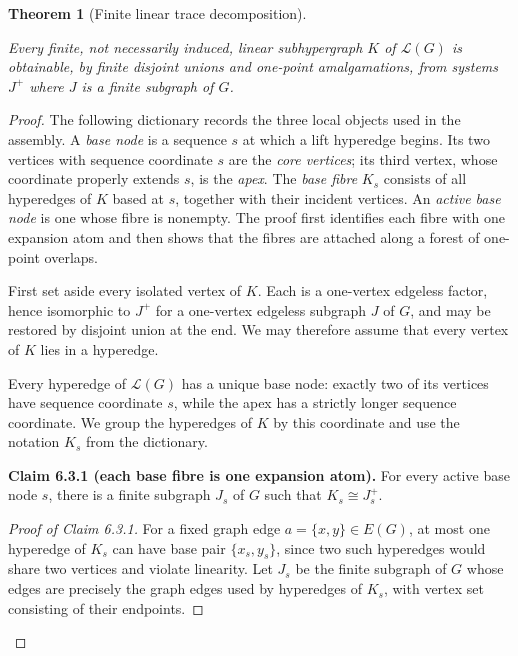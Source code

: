 \documentclass[a4paper,11pt,reqno]{amsart}
\theoremstyle{plain}
\newtheorem{theorem}{Theorem}[section]
\theoremstyle{definition}
\theoremstyle{remark}
\begin{document}
\begin{theorem}[Finite linear trace decomposition]\label{theorem-6.3-exact-finite-linear-trace-theorem}

Every finite, not necessarily induced, linear subhypergraph \(K\) of
\(\mathcal L(G)\) is obtainable, by finite disjoint unions and one-point
amalgamations, from systems \(J^+\) where \(J\) is a finite subgraph of
\(G\).

\end{theorem}
\begin{proof}
The following dictionary records the three local objects used
in the assembly. A \emph{base node} is a sequence \(s\) at which a lift
hyperedge begins. Its two vertices with sequence coordinate \(s\) are the
\emph{core vertices}; its third vertex, whose coordinate properly extends
\(s\), is the \emph{apex}. The \emph{base fibre} \(K_s\) consists of all
hyperedges of \(K\) based at \(s\), together with their incident vertices.
An \emph{active base node} is one whose fibre is nonempty. The proof first
identifies each fibre with one expansion atom and then shows that the fibres
are attached along a forest of one-point overlaps.

First set aside every isolated vertex of \(K\). Each is a one-vertex edgeless
factor, hence isomorphic to \(J^+\) for a one-vertex edgeless subgraph \(J\)
of \(G\), and may be restored by disjoint union at the end. We may therefore
assume that every vertex of \(K\) lies in a hyperedge.

Every hyperedge of \(\mathcal L(G)\) has a unique base node: exactly two of
its vertices have sequence coordinate \(s\), while the apex has a strictly
longer sequence coordinate. We group the hyperedges of \(K\) by this
coordinate and use the notation \(K_s\) from the dictionary.

\medskip
\noindent\textbf{Claim 6.3.1 (each base fibre is one expansion atom).}
For every active base node \(s\), there is a finite subgraph \(J_s\) of
\(G\) such that \(K_s\cong J_s^+\).

\smallskip
\begin{proof}[Proof of Claim 6.3.1]

For a fixed graph edge \(a=\{x,y\}\in E(G)\), at most one hyperedge of \(K_s\) can have base pair \(\{x_s,y_s\}\), since two such hyperedges would share two vertices and violate linearity. Let \(J_s\) be the finite subgraph of \(G\) whose edges are precisely the graph edges used by hyperedges of \(K_s\), with vertex set consisting of their endpoints.


\end{proof}
\end{proof}
\end{document}
